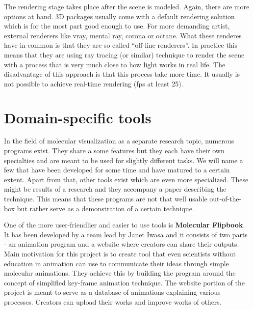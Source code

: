 \documentclass[
  digital, %
  table,   %
  nolof,     %
  nolot,     %
]{fithesis3}
\begin{document}

The rendering stage takes place after the scene is modeled. Again, there are more options at hand. 3D packages usually come with a default rendering solution which is for the most part good enough to use. For more demanding artist, external renderers like vray, mental ray, corona or octane. What these renderes have in common is that they are so called ``off-line renderers''. In practice this means that they are using ray tracing (or similar) technique to render the scene with a process that is very much close to how light works in real life. The disadvantage of this approach is that this process take more time. It usually is not possible to achieve real-time rendering (fps at least 25).

\section{Domain-specific tools}
In the field of molecular visualization as a separate research topic, numerous programs exist. They share a some features but they each have their own specialties and are meant to be used for slightly different tasks. We will name a few that have been developed for some time and have matured to a certain extent. Apart from that, other tools exist which are even more specialized. These might be results of a research and they accompany a paper describing the technique. This means that these programs are not that well usable out-of-the-box but rather serve as a demonstration of a certain technique.

One of the more user-friendlier and easier to use tools is \textbf{Molecular Flipbook}. It has been developed by a team lead by Janet Iwasa and it consists of two parts - an animation program and a website where creators can share their outputs. Main motivation for this project is to create tool that even scientists without education in animation can use to communicate their ideas through simple molecular animations. They achieve this by building the program around the concept of simplified key-frame animation technique. The website portion of the project is meant to serve as a database of animations explaining various processes. Creators can upload their works and improve works of others.
\end{document}
